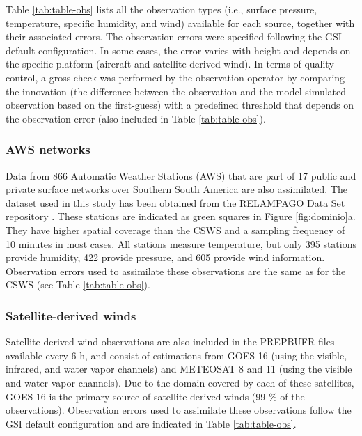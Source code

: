 \documentclass[preprint, 3p, authoryear,review, 12pt]{elsarticle} %
\begin{document}
Table \ref{tab:table-obs} lists all the observation types (i.e., surface pressure, temperature, specific humidity, and wind) available for each source, together with their associated errors. The observation errors were specified following the GSI default configuration. In some cases, the error varies with height and depends on the specific platform (aircraft and satellite-derived wind). In terms of quality control, a gross check was performed by the observation operator by comparing the innovation (the difference between the observation and the model-simulated observation based on the first-guess) with a predefined threshold that depends on the observation error (also included in Table \ref{tab:table-obs}).

\hypertarget{aws-networks}{%
\subsubsection{AWS networks}\label{aws-networks}}

Data from 866 Automatic Weather Stations (AWS) that are part of 17 public and private surface networks over Southern South America are also assimilated. The dataset used in this study has been obtained from the RELAMPAGO Data Set repository \citep{garcia2019}. These stations are indicated as green squares in Figure \ref{fig:dominio}a. They have higher spatial coverage than the CSWS and a sampling frequency of 10 minutes in most cases. All stations measure temperature, but only 395 stations provide humidity, 422 provide pressure, and 605 provide wind information.
Observation errors used to assimilate these observations are the same as for the CSWS (see Table \ref{tab:table-obs}).

\hypertarget{satellite-derived-winds}{%
\subsubsection{Satellite-derived winds}\label{satellite-derived-winds}}

Satellite-derived wind observations are also included in the PREPBUFR files available every 6 h, and consist of estimations from GOES-16 (using the visible, infrared, and water vapor channels) and METEOSAT 8 and 11 (using the visible and water vapor channels). Due to the domain covered by each of these satellites, GOES-16 is the primary source of satellite-derived winds (99 \% of the observations). Observation errors used to assimilate these observations follow the GSI default configuration and are indicated in Table \ref{tab:table-obs}.
\end{document}
